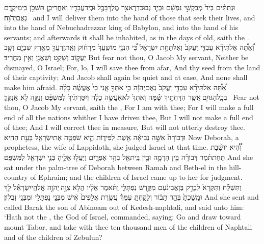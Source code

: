 {וּנְתַתִּ֗ים בְּיַד֙ מְבַקְשֵׁ֣י נַפְשָׁ֔ם וּבְיַ֛ד נְבוּכַדְרֶאצַּ֥ר מֶלֶךְ\maqqaf בָּבֶ֖ל וּבְיַד\maqqaf עֲבָדָ֑יו וְאַחֲרֵי\maqqaf כֵ֛ן תִּשְׁכֹּ֥ן כִּֽימֵי\maqqaf קֶ֖דֶם נְאֻם\maqqaf יְהֹוָֽה׃ \petucha }
{and I will deliver them into the hand of those that seek their lives, and into the hand of Nebuchadrezzar king of Babylon, and into the hand of his servants; and afterwards it shall be inhabited, as in the days of old, saith the \lord.}
{וְ֠אַתָּ֠ה אַל\maqqaf תִּירָ֞א עַבְדִּ֤י יַֽעֲקֹב֙ וְאַל\maqqaf תֵּחַ֣ת יִשְׂרָאֵ֔ל כִּ֠י הִנְנִ֤י מוֹשִֽׁעֲךָ֙ מֵרָח֔וֹק וְאֶֽת\maqqaf זַרְעֲךָ֖ מֵאֶ֣רֶץ שִׁבְיָ֑ם וְשָׁ֧ב יַעֲק֛וֹב וְשָׁקַ֥ט וְשַׁאֲנַ֖ן וְאֵ֥ין מַחֲרִֽיד׃}
{But fear not thou, O Jacob My servant, Neither be dismayed, O Israel; For, lo, I will save thee from afar, And thy seed from the land of their captivity; And Jacob shall again be quiet and at ease, And none shall make him afraid.}
{אַ֠תָּ֠ה אַל\maqqaf תִּירָ֞א עַבְדִּ֤י יַֽעֲקֹב֙ נְאֻם\maqqaf יְהֹוָ֔ה כִּ֥י אִתְּךָ֖ אָ֑נִי כִּי֩ אֶעֱשֶׂ֨ה כָלָ֜ה בְּכׇֽל\maqqaf הַגּוֹיִ֣ם \legarmeh  אֲשֶׁ֧ר הִדַּחְתִּ֣יךָ שָּׁ֗מָּה וְאֹֽתְךָ֙ לֹא\maqqaf אֶעֱשֶׂ֣ה כָלָ֔ה וְיִסַּרְתִּ֙יךָ֙ לַמִּשְׁפָּ֔ט וְנַקֵּ֖ה לֹ֥א אֲנַקֶּֽךָּ׃ \petucha }
{Fear not thou, O Jacob My servant, saith the \lord, For I am with thee; For I will make a full end of all the nations whither I have driven thee, But I will not make a full end of thee; And I will correct thee in measure, But will not utterly destroy thee.}
\label{haft_16}
\setcounter{chap}{4}
\setcounter{verse}{4}
{וּדְבוֹרָה֙ אִשָּׁ֣ה נְבִיאָ֔ה אֵ֖שֶׁת לַפִּיד֑וֹת הִ֛יא שֹׁפְטָ֥ה אֶת\maqqaf יִשְׂרָאֵ֖ל בָּעֵ֥ת הַהִֽיא׃}
{Now Deborah, a prophetess, the wife of Lappidoth, she judged Israel at that time.}
{וְ֠הִ֠יא יוֹשֶׁ֨בֶת תַּחַת\maqqaf תֹּ֜מֶר דְּבוֹרָ֗ה בֵּ֧ין הָרָמָ֛ה וּבֵ֥ין בֵּֽית\maqqaf אֵ֖ל בְּהַ֣ר אֶפְרָ֑יִם וַיַּעֲל֥וּ אֵלֶ֛יהָ בְּנֵ֥י יִשְׂרָאֵ֖ל לַמִּשְׁפָּֽט׃}
{And she sat under the palm-tree of Deborah between Ramah and Beth-el in the hill-country of Ephraim; and the children of Israel came up to her for judgment.}
{וַתִּשְׁלַ֗ח וַתִּקְרָא֙ לְבָרָ֣ק בֶּן\maqqaf אֲבִינֹ֔עַם מִקֶּ֖דֶשׁ נַפְתָּלִ֑י וַתֹּ֨אמֶר אֵלָ֜יו הֲלֹ֥א צִוָּ֣ה \legarmeh  יְהֹוָ֣ה אֱלֹהֵֽי\maqqaf יִשְׂרָאֵ֗ל לֵ֤ךְ וּמָֽשַׁכְתָּ֙ בְּהַ֣ר תָּב֔וֹר וְלָקַחְתָּ֣ עִמְּךָ֗ עֲשֶׂ֤רֶת אֲלָפִים֙ אִ֔ישׁ מִבְּנֵ֥י נַפְתָּלִ֖י וּמִבְּנֵ֥י זְבֻלֽוּן׃}
{And she sent and called Barak the son of Abinoam out of Kedesh-naphtali, and said unto him: ‘Hath not the \lord, the God of Israel, commanded, saying: Go and draw toward mount Tabor, and take with thee ten thousand men of the children of Naphtali and of the children of Zebulun?}
